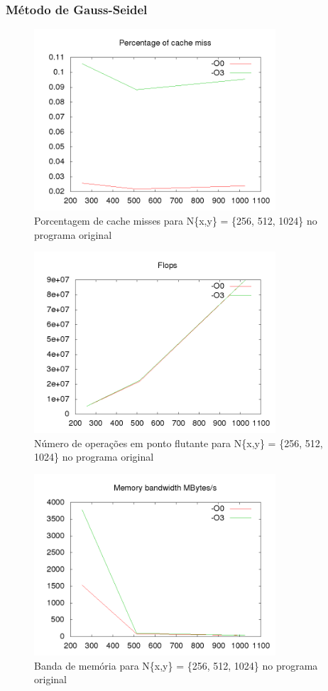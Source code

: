 \documentclass[12pt]{article}
\begin{document}
		\subsubsection{Método de Gauss-Seidel}
		\begin{figure}[ht!]
			\centering
			\includegraphics[width=90mm]{old_gs_cache.png}
			\caption{Porcentagem de cache misses para N\{x,y\} = \{256, 512, 1024\} no programa original}
		\end{figure}

		\begin{figure}[ht!]
			\centering
			\includegraphics[width=90mm]{old_gs_flops.png}
			\caption{Número de operações em ponto flutante para N\{x,y\} = \{256, 512, 1024\} no programa original}
		\end{figure}
		
		\newpage
		\begin{figure}[ht!]
			\centering
			\includegraphics[width=90mm]{old_gs_mem.png}
			\caption{Banda de memória para N\{x,y\} = \{256, 512, 1024\} no programa original}
		\end{figure}
		
\end{document}
